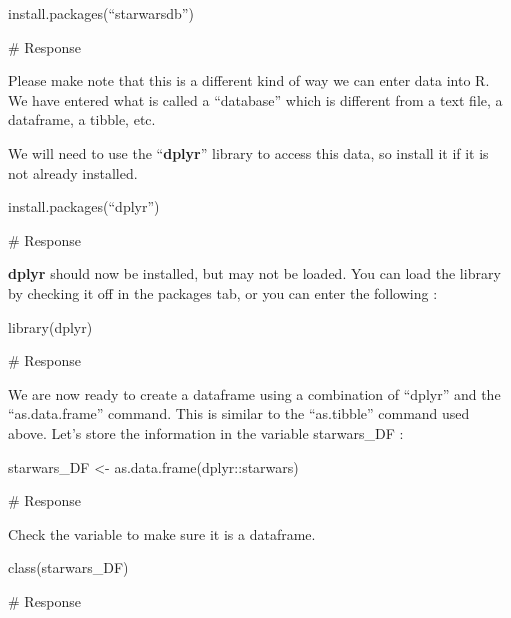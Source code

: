 \documentclass[
  letterpaper,
  DIV=11,
  numbers=noendperiod]{scrreprt}
\newenvironment{Shaded}{\begin{snugshade}}{\end{snugshade}}
\newcommand{\CommentTok}[1]{\textcolor[rgb]{0.37,0.37,0.37}{#1}}
\begin{document}
install.packages(``starwarsdb'')

\begin{Shaded}
\begin{Highlighting}[]
\CommentTok{\# Response}
\end{Highlighting}
\end{Shaded}

Please make note that this is a different kind of way we can enter data
into R. We have entered what is called a ``database'' which is different
from a text file, a dataframe, a tibble, etc.

We will need to use the ``\textbf{dplyr}'' library to access this data,
so install it if it is not already installed.

install.packages(``dplyr'')

\begin{Shaded}
\begin{Highlighting}[]
\CommentTok{\# Response}
\end{Highlighting}
\end{Shaded}

\textbf{dplyr} should now be installed, but may not be loaded. You can
load the library by checking it off in the packages tab, or you can
enter the following :

library(dplyr)

\begin{Shaded}
\begin{Highlighting}[]
\CommentTok{\# Response}
\end{Highlighting}
\end{Shaded}

We are now ready to create a dataframe using a combination of ``dplyr''
and the ``as.data.frame'' command. This is similar to the ``as.tibble''
command used above. Let's store the information in the variable
starwars\_DF :

starwars\_DF \textless- as.data.frame(dplyr::starwars)

\begin{Shaded}
\begin{Highlighting}[]
\CommentTok{\# Response}
\end{Highlighting}
\end{Shaded}

Check the variable to make sure it is a dataframe.

class(starwars\_DF)

\begin{Shaded}
\begin{Highlighting}[]
\CommentTok{\# Response}
\end{Highlighting}
\end{Shaded}
\end{document}
